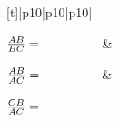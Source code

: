 {\begin{center}
    \noindent
      \tablelasttail{}
      \begin{xtabular*}{\mytablewidth}[t]{|p{10\mystarwidth}|p{10\mystarwidth}|p{10\mystarwidth}|}\hline
     \tabularnewline{}
    
    
        
                \begin{math}\frac{AB}{BC}=\phantom{\rule{42.67912pt}{0ex}}\end{math}
               &
    
    
        
                \begin{math}\frac{AB}{AC}=\phantom{\rule{42.67912pt}{0ex}}\end{math}
               &
    
    
        
                \begin{math}\frac{CB}{AC}=\phantom{\rule{42.67912pt}{0ex}}\end{math}
     \tabularnewline{}
    

\end{xtabular*}
\end{center}}
